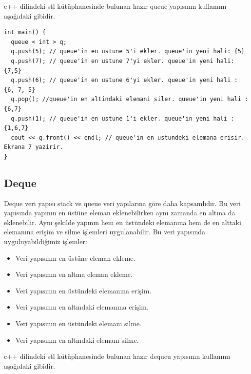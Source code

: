 \documentclass[12pt]{article}
\begin{document}
    c++ dilindeki stl k\"{u}t\"{u}phanesinde bulunan haz{\i}r queue yap{\i}s{\i}n{\i}n kullan{\i}m{\i} a\c{s}a\u{g}{\i}daki gibidir.
    
    \begin{verbatim}
int main() {
  queue < int > q;
  q.push(5); // queue'in en ustune 5'i ekler. queue'in yeni hali: {5}
  q.push(7); // queue'in en ustune 7'yi ekler. queue'in yeni hali: {7,5}
  q.push(6); // queue'in en ustune 6'yi ekler. queue'in yeni hali : {6, 7, 5}
  q.pop(); //queue'in en altindaki elemani siler. queue'in yeni hali : {6,7}
  q.push(1); // queue'in en ustune 1'i ekler. queue'in yeni hali : {1,6,7}
  cout << q.front() << endl; // queue'in en ustundeki elemana erisir. Ekrana 7 yazirir.   
}
    \end{verbatim}
	
	\subsection{Deque}
	
	Deque veri yap{\i}s{\i} stack ve queue veri yap{\i}lar{\i}na g\"{o}re daha kapsaml{\i}d{\i}r.
    Bu veri yap{\i}s{\i}nda yap{\i}n{\i}n en \"{u}st\"{u}ne eleman eklenebilirken ayn{\i} zamanda en alt{\i}na da eklenebilir. Ayn{\i} \c{s}ekilde yap{\i}n{\i}n hem en \"{u}st\"{u}ndeki eleman{\i}na hem de en alttaki eleman{\i}na eri\c{s}im ve silme i\c{s}lemleri uygulanabilir. Bu veri yap{\i}s{\i}nda uyguluyabildi\u{g}imiz i\c{s}lemler:

    \begin{itemize}
        \item Veri yap{\i}s{\i}n{\i}n en \"{u}st\"{u}ne eleman ekleme.
        \item Veri yap{\i}s{\i}n{\i}n en alt{\i}na eleman ekleme.
        \item Veri yap{\i}s{\i}n{\i}n en \"{u}st\"{u}ndeki eleman{\i}na eri\c{s}im.
        \item Veri yap{\i}s{\i}n{\i}n en alt{\i}ndaki eleman{\i}na eri\c{s}im.
        \item Veri yap{\i}s{\i}n{\i}n en \"{u}st\"{u}ndeki eleman{\i} silme.
        \item Veri yap{\i}s{\i}n{\i}n en alt{\i}ndaki eleman{\i} silme.
    \end{itemize}
    
    c++ dilindeki stl k\"{u}t\"{u}phanesinde bulunan haz{\i}r dequeu yap{\i}s{\i}n{\i}n kullan{\i}m{\i} a\c{s}a\u{g}{\i}daki gibidir.    
    
\end{document}
